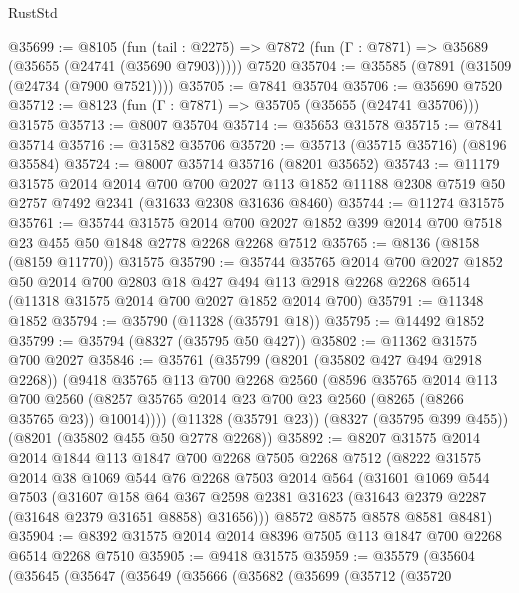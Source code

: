 \begin{lexlean}{RustStd}
\begin{coremodule}
{\begin{coremodule}
{{{{{{{{{{{{{{{{{{{{{{{{{{{{{{{{{{{{{{{{{{{{{{{{{{{{{{@35699 := @8105
    (fun (tail : @2275) => @7872 (fun (Γ : @7871) => @35689 (@35655 (@24741 (@35690 @7903)))))
    @7520
@35704 := @35585 (@7891 (@31509 (@24734 (@7900 @7521))))
@35705 := @7841 @35704
@35706 := @35690 @7520
@35712 := @8123 (fun (Γ : @7871) => @35705 (@35655 (@24741 @35706))) @31575
@35713 := @8007 @35704
@35714 := @35653 @31578
@35715 := @7841 @35714
@35716 := @31582 @35706
@35720 := @35713 (@35715 @35716) (@8196 @35584)
@35724 := @8007 @35714 @35716 (@8201 @35652)
@35743 := @11179
    @31575
    @2014
    @2014
    @700
    @700
    @2027
    @113
    @1852
    @11188
    @2308
    @7519
    @50
    @2757
    @7492
    @2341
    (@31633 @2308 @31636 @8460)
@35744 := @11274 @31575
@35761 := @35744
    @31575
    @2014
    @700
    @2027
    @1852
    @399
    @2014
    @700
    @7518
    @23
    @455
    @50
    @1848
    @2778
    @2268
    @2268
    @7512
@35765 := @8136 (@8158 (@8159 @11770)) @31575
@35790 := @35744
    @35765
    @2014
    @700
    @2027
    @1852
    @50
    @2014
    @700
    @2803
    @18
    @427
    @494
    @113
    @2918
    @2268
    @2268
    @6514
    (@11318 @31575 @2014 @700 @2027 @1852 @2014 @700)
@35791 := @11348 @1852
@35794 := @35790 (@11328 (@35791 @18))
@35795 := @14492 @1852
@35799 := @35794 (@8327 (@35795 @50 @427))
@35802 := @11362 @31575 @700 @2027
@35846 := @35761
    (@35799
      (@8201 (@35802 @427 @494 @2918 @2268))
      (@9418
        @35765
        @113
        @700
        @2268
        @2560
        (@8596
          @35765
          @2014
          @113
          @700
          @2560
          (@8257 @35765 @2014 @23 @700 @23 @2560 (@8265 (@8266 @35765 @23)) @10014))))
    (@11328 (@35791 @23))
    (@8327 (@35795 @399 @455))
    (@8201 (@35802 @455 @50 @2778 @2268))
@35892 := @8207
    @31575
    @2014
    @2014
    @1844
    @113
    @1847
    @700
    @2268
    @7505
    @2268
    @7512
    (@8222
      @31575
      @2014
      @38
      @1069
      @544
      @76
      @2268
      @7503
      @2014
      @564
      (@31601
        @1069
        @544
        @7503
        (@31607
          @158
          @64
          @367
          @2598
          @2381
          @31623
          (@31643 @2379 @2287 (@31648 @2379 @31651 @8858) @31656)))
      @8572
      @8575
      @8578
      @8581
      @8481)
@35904 := @8392 @31575 @2014 @2014 @8396 @7505 @113 @1847 @700 @2268 @6514 @2268 @7510
@35905 := @9418 @31575
@35959 := @35579
    (@35604
      (@35645
        (@35647
          (@35649
            (@35666
              (@35682
                (@35699
                  (@35712
                    (@35720
}}}}}}}}}}}}}}}}}}}}}}}}}}}}}}}}}}}}}}}}}}}}}}}}}}}}}}
\end{coremodule}}
\end{coremodule}
\end{lexlean}
